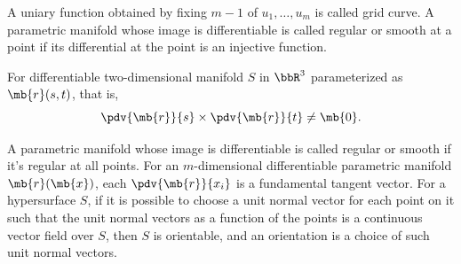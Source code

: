 A uniary function obtained by fixing $m-1$ of $u_1,\ldots,u_m$ is called grid curve.
A parametric manifold whose image is differentiable is called regular or smooth at a point if its differential at the point is an injective function.

For differentiable two-dimensional manifold $S$ in $\bbR^3$ parameterized as $\mb{r}(s,t)$, that is,
\[\pdv{\mb{r}}{s}\times\pdv{\mb{r}}{t}\ne\mb{0}.\]

A parametric manifold whose image is differentiable is called regular or smooth if it's regular at all points.
For an $m$-dimensional differentiable parametric manifold $\mb{r}(\mb{x})$, each $\pdv{\mb{r}}{x_i}$ is a fundamental tangent vector.
For a hypersurface $S$, if it is possible to choose a unit normal vector for each point on it such that the unit normal vectors as a function of the points is a continuous vector field over $S$, then $S$ is orientable, and an orientation is a choice of such unit normal vectors.

